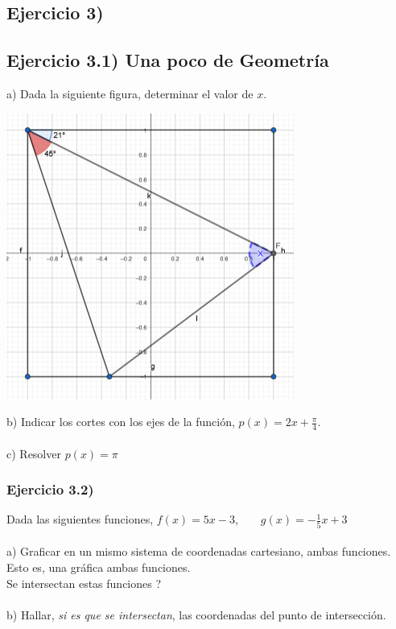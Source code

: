 \documentclass[11pt, a4paper]{article}
\begin{document}
\subsection*{Ejercicio 3)  }
\subsection*{Ejercicio 3.1)  Una poco de Geometr\'ia }
a) Dada la siguiente figura, determinar el valor de $x$. 
\begin{center}
   \includegraphics[scale=1]{problemaGeoyFunciones.png}
\end{center}
b) Indicar los cortes con los ejes de la funci\'on, $\displaystyle p(x) = 2x + \frac{\pi}{4}$. \\ \\ c) Resolver $p(x) = \pi$ 


\subsubsection*{Ejercicio 3.2) }
Dada las siguientes funciones, $f(x) = 5x - 3$, ~ ~ $\displaystyle g(x) = -\frac{1}{5}x + 3$ \\ \\ 
a) Graficar en un mismo sistema de coordenadas cartesiano, ambas funciones. Esto es, una gr\'afica ambas funciones. \\ Se intersectan estas funciones ? \\ \\
b) Hallar, \textit{si es que se intersectan}, las coordenadas del punto de intersecci\'on. 

\end{document}
